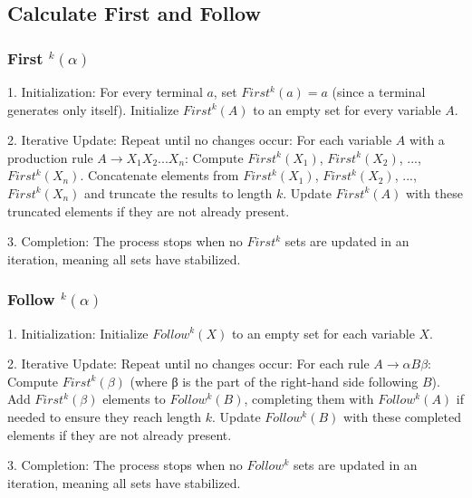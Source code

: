 
\subsection{Calculate First and Follow}
\subsubsection{First $^k(\alpha)$}
1. Initialization:
   For every terminal $a$, set $First^k(a) = {a}$ (since a terminal generates only itself).
   Initialize $First^k(A)$ to an empty set for every variable $A$.

2. Iterative Update:
   Repeat until no changes occur:
     For each variable $A$ with a production rule $A → X_1 X_2 ... X_n$:
     Compute $First^k(X_1)$, $First^k(X_2)$, ..., $First^k(X_n)$.
     Concatenate elements from $First^k(X_1)$, $First^k(X_2)$, ..., $First^k(X_n)$ and truncate the results to length $k$.
       Update $First^k(A)$ with these truncated elements if they are not already present.

3. Completion:
   The process stops when no $First^k$ sets are updated in an iteration, meaning all sets have stabilized.

\subsubsection{Follow $^k(\alpha)$}
1. Initialization:
   Initialize $Follow^k(X)$ to an empty set for each variable $X$.

2. Iterative Update:
   Repeat until no changes occur:
     For each rule $A → αBβ$:
       Compute $First^k(β)$ (where β is the part of the right-hand side following $B$).
       Add $First^k(β)$ elements to $Follow^k(B)$, completing them with $Follow^k(A)$ if needed to ensure they reach length $k$.
       Update $Follow^k(B)$ with these completed elements if they are not already present.

3. Completion:
   The process stops when no $Follow^k$ sets are updated in an iteration, meaning all sets have stabilized.



